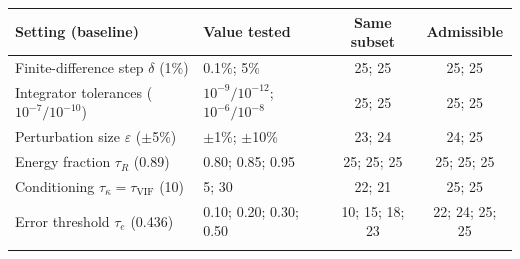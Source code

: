 \begin{tabular}{@{}llcc@{}}
\toprule
Setting (baseline) & Value tested & Same subset & Admissible \\
\midrule
Finite-difference step $\delta$ (1\%) & 0.1\%; 5\% & 25; 25 & 25; 25 \\
Integrator tolerances ($10^{-7}/10^{-10}$) & $10^{-9}/10^{-12}$; $10^{-6}/10^{-8}$ & 25; 25 & 25; 25 \\
Perturbation size $\varepsilon$ ($\pm$5\%) & $\pm$1\%; $\pm$10\% & 23; 24 & 24; 25 \\
Energy fraction $\tau_R$ (0.89) & 0.80; 0.85; 0.95 & 25; 25; 25 & 25; 25; 25 \\
Conditioning $\tau_\kappa=\tau_{\mathrm{VIF}}$ (10) & 5; 30 & 22; 21 & 25; 25 \\
Error threshold $\tau_e$ (0.436) & 0.10; 0.20; 0.30; 0.50 & 10; 15; 18; 23 & 22; 24; 25; 25 \\
\botrule
\end{tabular}
